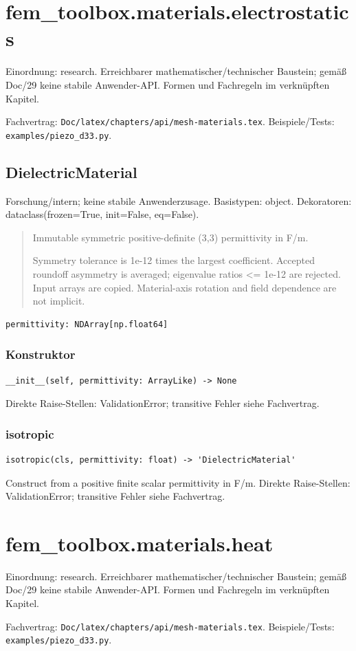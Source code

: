 \section{fem\_toolbox.materials.electrostatics}
Einordnung: research. Erreichbarer mathematischer/technischer Baustein; gemäß Doc/29 keine stabile Anwender-API. Formen und Fachregeln im verknüpften Kapitel.
\par Fachvertrag: \nolinkurl{Doc/latex/chapters/api/mesh-materials.tex}. Beispiele/Tests:
\nolinkurl{examples/piezo_d33.py}.
\subsection{DielectricMaterial}
Forschung/intern; keine stabile Anwenderzusage.
Basistypen: object. Dekoratoren: dataclass(frozen=True, init=False, eq=False).
\begin{quote}
Immutable symmetric positive-definite (3,3) permittivity in F/m.\par Symmetry tolerance is 1e-12 times the largest coefficient. Accepted roundoff asymmetry is averaged; eigenvalue ratios <= 1e-12 are rejected. Input arrays are copied. Material-axis rotation and field dependence are not implicit.
\end{quote}
\begin{lstlisting}
permittivity: NDArray[np.float64]
\end{lstlisting}
\subsubsection*{Konstruktor}
\begin{lstlisting}
__init__(self, permittivity: ArrayLike) -> None
\end{lstlisting}
Direkte Raise-Stellen: ValidationError; transitive Fehler siehe Fachvertrag.
\subsubsection*{isotropic}
\begin{lstlisting}
isotropic(cls, permittivity: float) -> 'DielectricMaterial'
\end{lstlisting}
Construct from a positive finite scalar permittivity in F/m.
Direkte Raise-Stellen: ValidationError; transitive Fehler siehe Fachvertrag.
\section{fem\_toolbox.materials.heat}
Einordnung: research. Erreichbarer mathematischer/technischer Baustein; gemäß Doc/29 keine stabile Anwender-API. Formen und Fachregeln im verknüpften Kapitel.
\par Fachvertrag: \nolinkurl{Doc/latex/chapters/api/mesh-materials.tex}. Beispiele/Tests:
\nolinkurl{examples/piezo_d33.py}.
